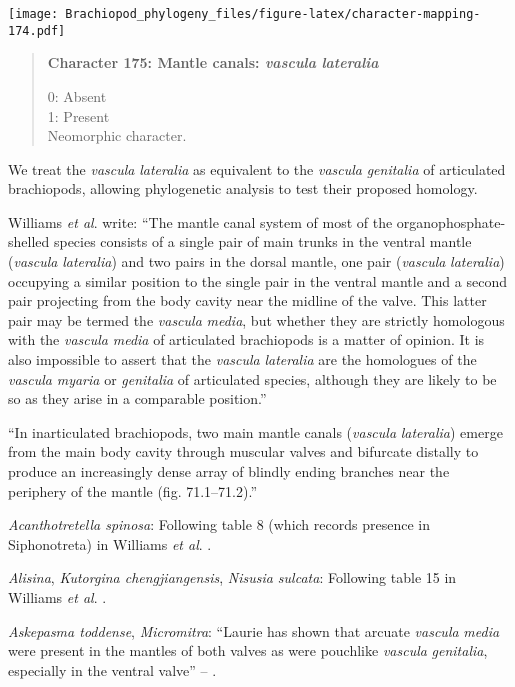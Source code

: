 \documentclass[openany]{book}
\theoremstyle{definition}
\theoremstyle{definition}
\theoremstyle{definition}
\theoremstyle{remark}
\begin{document}
\texttt{[image: Brachiopod\_phylogeny\_files/figure-latex/character-mapping-174.pdf]}

\begin{quote}
\textbf{Character 175: Mantle canals: \emph{vascula} \emph{lateralia}}

0: Absent\\
1: Present\\
Neomorphic character.
\end{quote}

We treat the \emph{vascula} \emph{lateralia} as equivalent to the
\emph{vascula} \emph{genitalia} of articulated brachiopods, allowing
phylogenetic analysis to test their proposed homology.

Williams \emph{et al}. \citeyearpar{Williams1997Introduction} write:
``The mantle canal system of most of the organophosphate-shelled species
consists of a single pair of main trunks in the ventral mantle
(\emph{vascula} \emph{lateralia}) and two pairs in the dorsal mantle,
one pair (\emph{vascula} \emph{lateralia}) occupying a similar position
to the single pair in the ventral mantle and a second pair projecting
from the body cavity near the midline of the valve. This latter pair may
be termed the \emph{vascula} \emph{media}, but whether they are strictly
homologous with the \emph{vascula} \emph{media} of articulated
brachiopods is a matter of opinion. It is also impossible to assert that
the \emph{vascula} \emph{lateralia} are the homologues of the
\emph{vascula} \emph{myaria} or \emph{genitalia} of articulated species,
although they are likely to be so as they arise in a comparable
position.''

``In inarticulated brachiopods, two main mantle canals (\emph{vascula}
\emph{lateralia}) emerge from the main body cavity through muscular
valves and bifurcate distally to produce an increasingly dense array of
blindly ending branches near the periphery of the mantle (fig.
71.1--71.2).''

\hypertarget{Acanthotretella_spinosa-coding-175}{}
\emph{Acanthotretella spinosa}: Following table 8 (which records
presence in Siphonotreta) in Williams \emph{et al}.
\citeyearpar{Williams2000LinguliformeaCraniiformea}.

\hypertarget{Alisina-coding-175}{}
\emph{Alisina}, \emph{Kutorgina chengjiangensis}, \emph{Nisusia
sulcata}: Following table 15 in Williams \emph{et al}.
\citeyearpar{Williams2000LinguliformeaCraniiformea}.

\hypertarget{Askepasma_toddense-coding-175}{}
\emph{Askepasma toddense}, \emph{Micromitra}: ``Laurie
\citeyearpar{Laurie1987Themusculature} has shown that arcuate
\emph{vascula} \emph{media} were present in the mantles of both valves
as were pouchlike \emph{vascula} \emph{genitalia}, especially in the
ventral valve'' -- \citet{Williams1997Introduction}.
\end{document}
